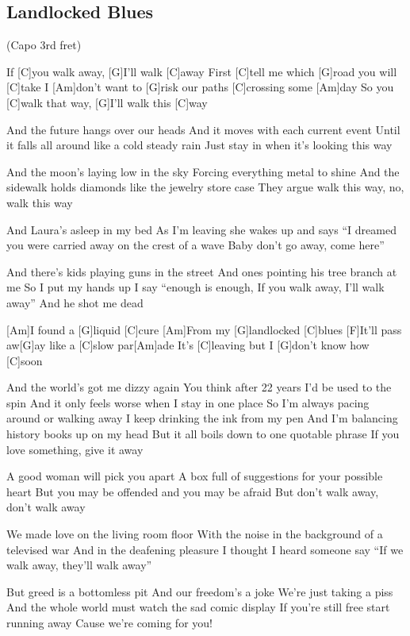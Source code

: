 \subsection*{Landlocked Blues   }
\begin{guitar}
\begin{multicols}{2}
(Capo 3rd fret)

If [C]you walk away, [G]I’ll walk [C]away
First [C]tell me which [G]road you will [C]take
I [Am]don’t want to [G]risk our paths [C]crossing some [Am]day
So you [C]walk that way, [G]I’ll walk this [C]way

And the future hangs over our heads
And it moves with each current event
Until it falls all around like a cold steady rain
Just stay in when it’s looking this way

And the moon’s laying low in the sky
Forcing everything metal to shine
And the sidewalk holds diamonds like the jewelry store case
They argue walk this way, no, walk this way

And Laura’s asleep in my bed
As I’m leaving she wakes up and says
“I dreamed you were carried away on the crest of a wave
Baby don’t go away, come here”

And there’s kids playing guns in the street
And ones pointing his tree branch at me
So I put my hands up I say “enough is enough,
If you walk away, I’ll walk away”
And he shot me dead

[Am]I found a [G]liquid [C]cure
[Am]From my [G]landlocked [C]blues
[F]It’ll pass aw[G]ay like a [C]slow par[Am]ade
It’s [C]leaving but I [G]don’t know how [C]soon

And the world’s got me dizzy again
You think after 22 years I’d be used to the spin
And it only feels worse when I stay in one place
So I’m always pacing around or walking away
I keep drinking the ink from my pen
And I’m balancing history books up on my head
But it all boils down to one quotable phrase
If you love something, give it away

A good woman will pick you apart
A box full of suggestions for your possible heart
But you may be offended and you may be afraid
But don’t walk away, don’t walk away

We made love on the living room floor
With the noise in the background of a televised war
And in the deafening pleasure I thought I heard someone say
“If we walk away, they’ll walk away”

But greed is a bottomless pit
And our freedom’s a joke
We’re just taking a piss
And the whole world must watch the sad comic display
If you’re still free start running away
Cause we’re coming for you!


\end{multicols}
\end{guitar}
